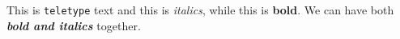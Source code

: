 \documentclass{article}
\begin{document}
This is \texttt{teletype} text and this is \textit{italics}, while this is \textbf{bold}.
We can have both \textit{\textbf{bold and italics}} together.
\end{document}
